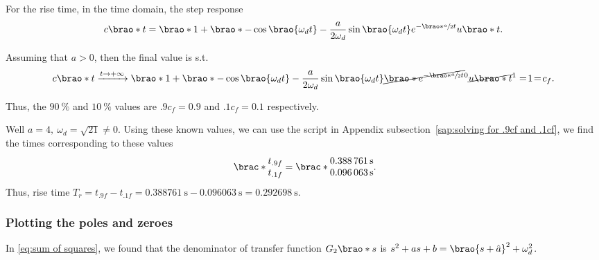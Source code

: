\documentclass[12pt]{article}
\DeclarePairedDelimiter\brao()%
\DeclarePairedDelimiter\brac[]%
\begin{document}
\begin{enumerate}[(a)]
        For the rise time, in the time domain, the step response
        \begin{equation}
            \begin{aligned}
                c\brao*t = \brao*{1 + \brao*{-\cos\brao{\omega_d t} - \frac{a}{2\omega_d} \sin\brao{\omega_d t} }{e^{-\brao*{\sfrac{a}2}t}}}u\brao*t.
            \end{aligned}
        \end{equation}

        Assuming that $a > 0$, then the final value is s.t.
        \begin{equation}
            c\brao*t
            \xrightarrow{t\to+\infty} \brao*{1 + \brao*{-\cos\brao{\omega_d t} - \frac{a}{2\omega_d} \sin\brao{\omega_d t} }\cancel{\brao*{e^{-\brao*{\sfrac{a}2}t}}}^0} \cancel{u\brao*t}^1 =\!1\!=\!c_f.
        \end{equation}

        Thus, the $\SI{90}\percent$ and $\SI{10}\percent$ values are $.9c_f = 0.9$ and $.1c_f = 0.1$ respectively.

        Well $a = 4,\ \omega_d = \sqrt{21} \not= 0$.
        Using these known values, we can use the script in Appendix subsection~\ref{sap:solving for .9cf and .1cf}, we find the times corresponding to these values
        \begin{equation}
            \brac*{
                \begin{matrix}
                    t_{.9f} \\*
                    t_{.1f} \\*
                \end{matrix}
            }
            =
            \brac*{
                \begin{matrix}
                    \SI{0.388761}\second \\*
                    \SI{0.096063}\second \\*
                \end{matrix}
            }\rlap.
        \end{equation}
        Thus, rise time $T_r = t_{.9f} - t_{.1f} = \SI{0.388761}\second - \SI{0.096063}\second = \SI{0.292698}\second$.

        \subsubsection{Plotting the poles and zeroes}\label{sss:poles-zeros}

        In \eqref{eq:sum of squares}, we found that the denominator of transfer function $G_2\brao*s$ is $s^2 + as + b = \brao{s + \hat{a}}^2 + \omega_d^2$.


\end{enumerate}
\end{document}
